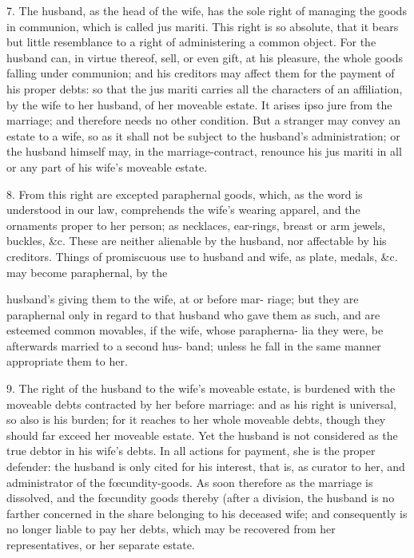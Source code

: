\documentclass{article}
\begin{document}
7. The husband, as the head of the wife, has the sole right of managing the goods in communion, which is called jus mariti. This right is so absolute, that it bears but little resemblance to a right of administering a common object. For the husband can, in virtue thereof, sell, or even gift, at his pleasure, the whole goods falling under communion; and his creditors may affect them for the payment of his proper debts: so that the jus mariti carries all the characters of an affiliation, by the wife to her husband, of her moveable estate. It arises ipso jure from the marriage; and therefore needs no other condition. But a stranger may convey an estate to a wife, so as it shall not be subject to the husband's administration; or the husband himself may, in the marriage-contract, renounce his jus mariti in all or any part of his wife's moveable estate.

8. From this right are excepted paraphernal goods, which, as the word is understood in our law, comprehends the wife's wearing apparel, and the ornaments proper to her person; as necklaces, ear-rings, breast or arm jewels, buckles, \&c. These are neither alienable by the husband, nor affectable by his creditors. Things of promiscuous use to husband and wife, as plate, medals, \&c. may become paraphernal, by the

husband's giving them to the wife, at or before mar-
riage; but they are paraphernal only in regard to
that husband who gave them as such, and are esteemed
common movables, if the wife, whose parapherna-
lia they were, be afterwards married to a second hus-
band; unless he fall in the same manner appropriate
them to her.

9. The right of the husband to the wife's moveable estate, is burdened with the moveable debts contracted by her before marriage: and as his right is universal, so also is his burden; for it reaches to her whole moveable debts, though they should far exceed her moveable estate. Yet the husband is not considered as the true debtor in his wife's debts. In all actions for payment, she is the proper defender: the husband is only cited for his interest, that is, as curator to her, and administrator of the fœcundity-goods. As soon therefore as the marriage is dissolved, and the fœcundity goods thereby (after a division, the husband is no farther concerned in the share belonging to his deceased wife; and consequently is no longer liable to pay her debts, which may be recovered from her representatives, or her separate estate.
\end{document}
